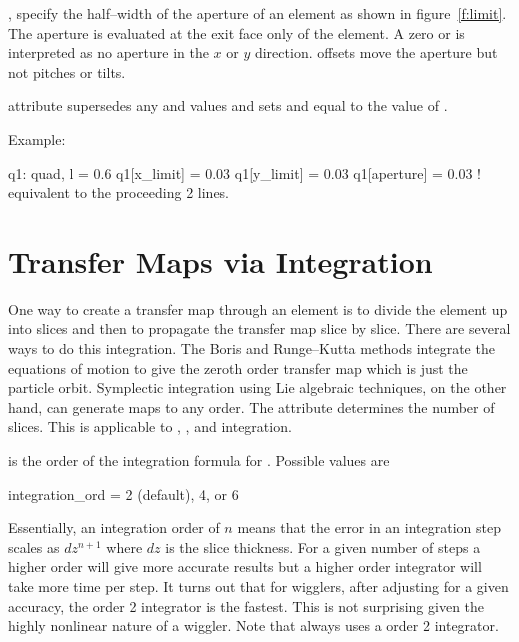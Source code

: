 ,  specify the half--width of the 
aperture of an element as shown in figure~\ref{f:limit}. 
The aperture is evaluated at the exit
face only of the element. A zero  or 
is interpreted as no aperture in the $x$ or $y$ direction.
offsets move the aperture but not pitches or tilts.

 attribute supersedes
any  and  values and sets  and
 equal to the value of .

\noindent
Example:
\begin{example}
  q1: quad, l = 0.6
  q1[x_limit] = 0.03
  q1[y_limit] = 0.03
  q1[aperture] = 0.03  ! equivalent to the proceeding 2 lines.  
\end{example}

\section{Transfer Maps via Integration}
\label{s:integ}

One way to create a transfer map through an element is to divide the
element up into slices and then to propagate the transfer
map slice by slice.
There are several ways to do this integration. The Boris and Runge--Kutta 
methods integrate the equations of motion to give the zeroth order
transfer map which is just the particle orbit.
Symplectic integration using Lie algebraic techniques, on the other hand, 
can generate maps to any order.
The  attribute determines the number of slices. This is
applicable to , , and 
integration. 

 is the order of the integration formula for 
. Possible values are
\begin{example}
  integration\_ord = 2 (default), 4, or 6
\end{example}
Essentially, an integration order of $n$ means that the error in an 
integration step scales as $dz^{n+1}$ where $dz$ is the slice thickness.
For a given number of steps a higher order will give more accurate results
but a higher order integrator will take more time per step. It turns out
that for wigglers, after adjusting  for a given accuracy, 
the order 2 integrator is the fastest. This is not surprising given the
highly nonlinear nature of a wiggler. Note that  always
uses a order 2 integrator.

